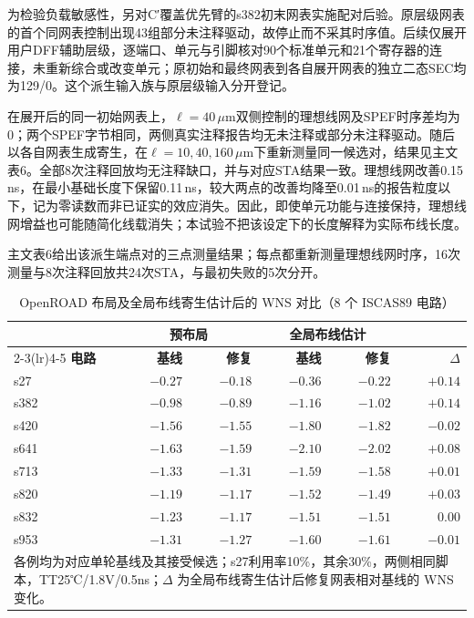 \documentclass[twocolumn,10pt,fontset=windows]{ctexart}
\begin{document}
为检验负载敏感性，另对C′覆盖优先臂的s382初末网表实施配对后验。原层级网表的首个同网表控制出现43组部分未注释驱动，故停止而不采其时序值。后续仅展开用户DFF辅助层级，逐端口、单元与引脚核对90个标准单元和21个寄存器的连接，未重新综合或改变单元；原初始和最终网表到各自展开网表的独立二态SEC均为129/0。这个派生输入族与原层级输入分开登记。

在展开后的同一初始网表上，$\ell=40\,\mu$m双侧控制的理想线网及SPEF时序差均为0；两个SPEF字节相同，两侧真实注释报告均无未注释或部分未注释驱动。随后以各自网表生成寄生，在$\ell=10,40,160\,\mu$m下重新测量同一候选对，结果见主文表6。全部8次注释回放均无注释缺口，并与对应STA结果一致。理想线网改善0.15\,ns，在最小基础长度下保留0.11\,ns，较大两点的改善均降至0.01\,ns的报告粒度以下，记为零读数而非已证实的效应消失。因此，即使单元功能与连接保持，理想线网增益也可能随简化线载消失；本试验不把该设定下的长度解释为实际布线长度。

主文表6给出该派生端点对的三点测量结果；每点都重新测量理想线网时序，16次测量与8次注释回放共24次STA，与最初失败的5次分开。



\begin{table}[ht]
\centering
\caption{OpenROAD 布局及全局布线寄生估计后的 WNS 对比（8 个 ISCAS89 电路）}
\label{tab:pr8}
\footnotesize
\setlength{\tabcolsep}{2pt}
\begin{tabular}{lrrrrr}
\toprule
 & \multicolumn{2}{c}{\textbf{预布局}} & \multicolumn{2}{c}{\textbf{全局布线估计}} & \\
\cmidrule(lr){2-3}\cmidrule(lr){4-5}
\textbf{电路} & \textbf{基线} & \textbf{修复} & \textbf{基线} & \textbf{修复} & $\Delta$ \\
\midrule
s27  & $-0.27$ & $-0.18$ & $-0.36$ & $-0.22$ & $+0.14$ \\
s382 & $-0.98$ & $-0.89$ & $-1.16$ & $-1.02$ & $+0.14$ \\
s420 & $-1.56$ & $-1.55$ & $-1.80$ & $-1.82$ & $-0.02$ \\
s641 & $-1.63$ & $-1.59$ & $-2.10$ & $-2.02$ & $+0.08$ \\
s713 & $-1.33$ & $-1.31$ & $-1.59$ & $-1.58$ & $+0.01$ \\
s820 & $-1.19$ & $-1.17$ & $-1.52$ & $-1.49$ & $+0.03$ \\
s832 & $-1.23$ & $-1.17$ & $-1.51$ & $-1.51$ & $0.00$ \\
s953 & $-1.31$ & $-1.27$ & $-1.60$ & $-1.61$ & $-0.01$ \\
\bottomrule
\multicolumn{6}{p{0.92\columnwidth}}{\footnotesize 各例均为对应单轮基线及其接受候选；s27利用率10\%，其余30\%，两侧相同脚本，TT25℃/1.8V/0.5ns；$\Delta$ 为全局布线寄生估计后修复网表相对基线的 WNS 变化。}\\
\end{tabular}
\end{table}
\end{document}
